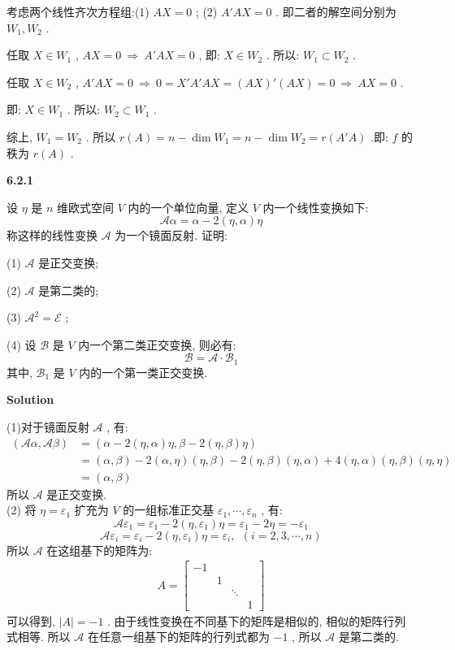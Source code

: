 \documentclass[11pt,a4paper,openany,oneside]{book}
\newcommand\Solution{\noindent\textbf{\textsf{Solution}}\par\medskip}
\begin{document}
考虑两个线性齐次方程组:(1)  $ AX = 0 $ ; (2)  $ A'AX = 0 $ . 即二者的解空间分别为 $ W_1, W_2 $ .

任取 $ X \in W_1 $ ,  $ AX = 0 \ \Rightarrow \ A'AX = 0 $ , 即: $ X \in W_2 $ . 所以: $ W_1 \subset W_2 $ .

任取 $ X \in W_2 $ ,  $ A'AX=0 \ \Rightarrow \ 0 = X'A'AX = (AX)'(AX) = 0 \ \Rightarrow \ AX = 0 $ .

即: $ X \in W_1 $ . 所以: $ W_2 \subset W_1 $ .

综上,  $ W_1 = W_2 $ . 所以 $ r(A) = n - \dim W_1 = n - \dim W_2 = r(A'A) $ .即: $ f $ 的秩为 $ r(A) $ .   


\begin{myexample}
	\textbf{6.2.1}

设 $ \eta $ 是 $ n $ 维欧式空间 $ V $ 内的一个单位向量, 定义 $ V $ 内一个线性变换如下:
 $$  \mathcal{A}\alpha = \alpha - 2(\eta, \alpha)\eta  $$ 
称这样的线性变换 $ \mathcal{A} $ 为一个镜面反射. 证明:

(1)  $ \mathcal{A} $ 是正交变换; 

(2)  $ \mathcal{A} $ 是第二类的;

(3)  $ \mathcal{A}^2 = \mathcal{E} $ ; 

(4) 设 $ \mathcal{B} $ 是 $ V $ 内一个第二类正交变换, 则必有:
 $$  \mathcal{B} = \mathcal{A} \cdot \mathcal{B}_1   $$ 
其中,  $ \mathcal{B}_1 $ 是 $ V $ 内的一个第一类正交变换. \\ 

\end{myexample}
\Solution 

(1)对于镜面反射 $ \mathcal{A} $ , 有:
\begin{align*}
(\mathcal{A}\alpha, \mathcal{A}\beta) &= (\alpha - 2(\eta, \alpha)\eta, \beta - 2(\eta, \beta)\eta)  \\
&= (\alpha, \beta) - 2(\alpha, \eta)(\eta, \beta) - 2(\eta, \beta)(\eta, \alpha) + 4(\eta, \alpha)(\eta, \beta)(\eta, \eta)  \\
&= (\alpha, \beta) 
\end{align*}
所以 $ \mathcal{A} $ 是正交变换.  \\

(2) 将 $ \eta = \varepsilon_1 $ 扩充为 $ V $ 的一组标准正交基 $ \varepsilon_1, \cdots, \varepsilon_n $ , 有:
 $$  \mathcal{A}\varepsilon_1 = \varepsilon_1 - 2(\eta, \varepsilon_1)\eta = \varepsilon_1 - 2\eta = -\varepsilon_1  $$ 
 $$  \mathcal{A}\varepsilon_i = \varepsilon_i - 2(\eta, \varepsilon_i)\eta = \varepsilon_i, \ \ (i=2,3, \cdots, n)  $$ 
所以 $ \mathcal{A} $ 在这组基下的矩阵为:
\begin{gather*}
A = 
\begin{bmatrix}
-1  &       &       &        \\
&   1   &       &         \\
&       & \ddots &       \\
&       &        &  1
\end{bmatrix}
\end{gather*}
可以得到,  $ |A| = -1 $ . 由于线性变换在不同基下的矩阵是相似的, 相似的矩阵行列式相等. 所以 $ \mathcal{A} $ 在任意一组基下的矩阵的行列式都为 $ -1 $ , 所以 $ \mathcal{A} $ 是第二类的. \\
\end{document}
